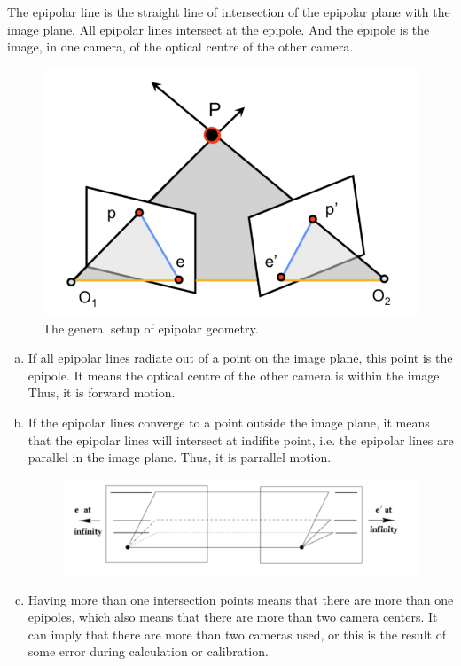 The epipolar line is the straight line of intersection of the epipolar plane with the image plane.  All epipolar lines intersect at the epipole. And the epipole is the image, in one camera, of the optical centre of the other camera.

\begin{figure}[htbp]
    \centering
    \includegraphics[width=0.5\linewidth]{Q3.png}
    \caption{The general setup of epipolar geometry.}
\end{figure}

\begin{enumerate}[(a)]

    \item If all epipolar lines radiate out of a point on the image plane, this point is the epipole. It means the optical centre of the other camera is within the image. Thus, it is forward motion.

    \item If the epipolar lines converge to a point outside the image plane, it means that the epipolar lines will intersect at indifite point, i.e. the epipolar lines are parallel in the image plane. Thus, it is parrallel motion.

          \begin{figure}[htbp]
              \centering
              \includegraphics[width=0.6\linewidth]{Q3_A2.png}
          \end{figure}

    \item Having more than one intersection points means that there are more than one epipoles, which also means that there are more than two camera centers. It can imply that there are more than two cameras used, or this is the result of some error during calculation or calibration.

\end{enumerate}


